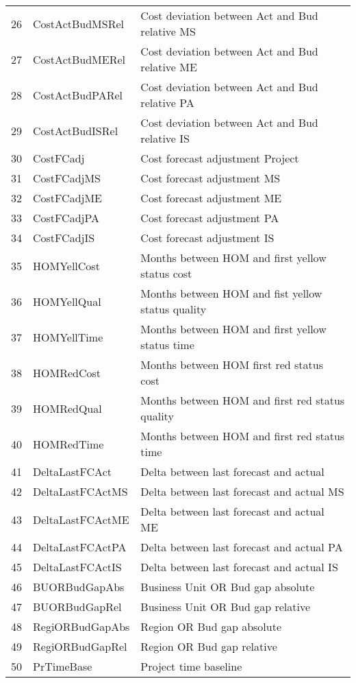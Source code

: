 \begin{longtable}[ht]{p{} p{}p{}}
26    & CostActBudMSRel & Cost deviation between Act and Bud relative MS \\
27    & CostActBudMERel & Cost deviation between Act and Bud relative ME\\
28    & CostActBudPARel & Cost deviation between Act and Bud relative PA \\
29    & CostActBudISRel & Cost deviation between Act and Bud relative IS \\
30    & CostFCadj & Cost forecast adjustment Project \\
31    & CostFCadjMS & Cost forecast adjustment MS \\
32    & CostFCadjME & Cost forecast adjustment ME \\
33    & CostFCadjPA & Cost forecast adjustment PA \\
34    & CostFCadjIS & Cost forecast adjustment IS \\
35    & HOMYellCost & Months between HOM and first yellow status cost \\
36    & HOMYellQual & Months between HOM and fist yellow status quality \\
37    & HOMYellTime & Months between HOM and first yellow status time \\
38    & HOMRedCost & Months between HOM first red status cost \\
39    & HOMRedQual & Months between HOM and first red status quality \\
40    & HOMRedTime & Months between HOM and first red status time \\
41    & DeltaLastFCAct & Delta between last forecast and actual  \\
42    & DeltaLastFCActMS & Delta between last forecast and actual MS \\
43    & DeltaLastFCActME & Delta between last forecast and actual ME \\
44    & DeltaLastFCActPA & Delta between last forecast and actual PA \\
45    & DeltaLastFCActIS & Delta between last forecast and actual IS \\
46    & BUORBudGapAbs & Business Unit OR Bud gap absolute \\
47    & BUORBudGapRel & Business Unit OR Bud gap relative \\
48    & RegiORBudGapAbs & Region OR Bud gap absolute \\
49    & RegiORBudGapRel & Region OR Bud gap relative \\
50    & PrTimeBase & Project time baseline \\

\end{longtable}
